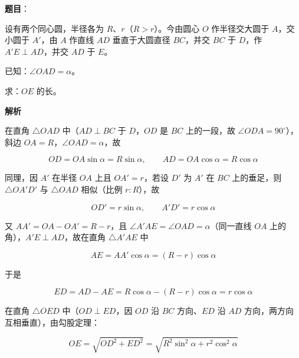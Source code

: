 \begin{answer}

\textbf{题目}：

设有两个同心圆，半径各为 $R$、$r$（$R>r$）。今由圆心 $O$ 作半径交大圆于 $A$，交小圆于 $A'$，由 $A$ 作直线 $AD$ 垂直于大圆直径 $BC$，并交 $BC$ 于 $D$，作 $A'E\perp AD$，并交 $AD$ 于 $E$。

已知：$\angle OAD=\alpha$。

求：$OE$ 的长。
\nopagebreak[4]
\begin{center}\end{center}
\nopagebreak[4]
\textbf{解析}
\nopagebreak[4]
\begin{center}\end{center}
\nopagebreak[4]
在直角 $\triangle OAD$ 中（$AD\perp BC$ 于 $D$，$OD$ 是 $BC$ 上的一段，故 $\angle ODA=90^\circ$），斜边 $OA=R$，$\angle OAD=\alpha$，故

\nopagebreak[4]
\[
OD=OA\sin\alpha=R\sin\alpha,\qquad AD=OA\cos\alpha=R\cos\alpha
\]

同理，因 $A'$ 在半径 $OA$ 上且 $OA'=r$，若设 $D'$ 为 $A'$ 在 $BC$ 上的垂足，则 $\triangle OA'D'$ 与 $\triangle OAD$ 相似（比例 $r:R$），故

\nopagebreak[4]
\[
OD'=r\sin\alpha,\qquad A'D'=r\cos\alpha
\]

又 $AA'=OA-OA'=R-r$，且 $\angle A'AE=\angle OAD=\alpha$（同一直线 $OA$ 上的角），$A'E\perp AD$，故在直角 $\triangle A'AE$ 中

\nopagebreak[4]
\[
AE=AA'\cos\alpha=(R-r)\cos\alpha
\]

于是

\nopagebreak[4]
\[
ED=AD-AE=R\cos\alpha-(R-r)\cos\alpha=r\cos\alpha
\]

在直角 $\triangle OED$ 中（$OD\perp ED$，因 $OD$ 沿 $BC$ 方向、$ED$ 沿 $AD$ 方向，两方向互相垂直），由勾股定理：

\nopagebreak[4]
\[
OE=\sqrt{OD^2+ED^2}=\sqrt{R^2\sin^2\alpha+r^2\cos^2\alpha}
\]


\end{answer}


